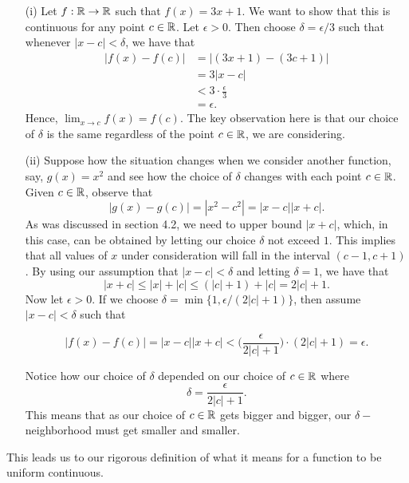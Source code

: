 \begin{enumerate}
    \item[(i)] Let \( f: \mathbb{R} \to \mathbb{R}  \) such that \( f(x) = 3x + 1  \). We want to show that this is continuous for any point \( c \in \mathbb{R}  \). Let \( \epsilon  > 0  \). Then choose \( \delta = \epsilon  / 3  \) such that whenever \( | x - c  | < \delta  \), we have that 
\begin{align*}
    | f(x) - f(c) | &= |  (3x + 1 ) - (3c + 1 ) |  \\
                    &= 3 | x - c  | \\
                    &< 3 \cdot \frac{ \epsilon  }{ 3 } \\
                    &= \epsilon.
\end{align*}
Hence, \( \lim_{ x \to c } f(x) = f(c) \). The key observation here is that our choice of \( \delta  \) is the same regardless of the point \( c \in \mathbb{R}  \), we are considering.
    \item[(ii)] Suppose how the situation changes when we consider another function, say, \( g(x) = x^2  \) and see how the choice of \( \delta  \) changes with each point \( c \in \mathbb{R}  \). Given \( c \in \mathbb{R}  \), observe that 
        \[  | g(x) - g(c) | = | x^2 - c^2  | = | x -c | | x + c  |.  \]
As was discussed in section 4.2, we need to upper bound \( | x + c  |  \), which, in this case, can be obtained by letting our choice \( \delta \) not exceed \( 1 \). This implies that all values of \( x  \) under consideration will fall in the interval \( (c - 1, c + 1 ) \). By using our assumption that \( | x - c  | < \delta  \) and letting \( \delta = 1  \), we have that 
\[  | x + c  | \leq | x | + | c  | \leq (| c  | + 1 ) + | c  | = 2 | c | + 1  . \] Now let \( \epsilon  > 0  \). If we choose \( \delta = \min \{ 1, \epsilon / (2 | c  | + 1 ) \} \), then assume \( | x - c  | < \delta  \) such that 

\[ | f(x) - f(c)  | = | x - c  | | x + c  | < \Big( \frac{ \epsilon  }{ 2 | c  | + 1  }  \Big) \cdot ( 2 | c  | + 1) = \epsilon. \]

Notice how our choice of \( \delta \) depended on our choice of \( c \in \mathbb{R}  \) where 
\[  \delta = \frac{ \epsilon  }{ 2 | c  | + 1  }. \]
This means that as our choice of \( c \in \mathbb{R}  \) gets bigger and bigger, our \( \delta - \)neighborhood must get smaller and smaller.
\end{enumerate}


This leads us to our rigorous definition of what it means for a function to be uniform continuous.

